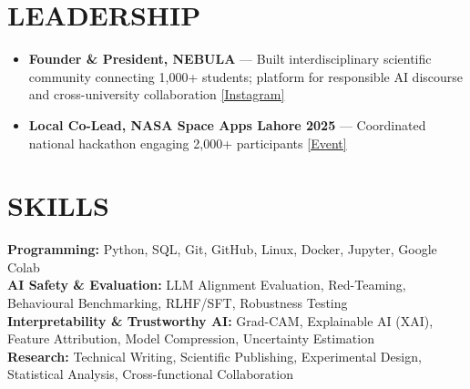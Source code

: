 \documentclass[letterpaper,9pt]{article}
\newcommand{\resumeItem}[1]{
  \item \small{#1}
}
\begin{document}
\section{LEADERSHIP}
\begin{itemize}
\resumeItem{\textbf{Founder \& President, NEBULA} — Built interdisciplinary scientific community connecting 1,000+ students; platform for responsible AI discourse and cross-university collaboration \href{https://www.instagram.com/nebula_headquarters?igsh=Ymc5ZXB4ZDAwa3Bx&utm_source=qr}{[Instagram]}}
\resumeItem{\textbf{Local Co-Lead, NASA Space Apps Lahore 2025} — Coordinated national hackathon engaging 2,000+ participants \href{https://www.spaceappschallenge.org/2025/local-events/lahore/}{[Event]}}
\end{itemize}

\section{SKILLS}
\small{
\textbf{Programming:} Python, SQL, Git, GitHub, Linux, Docker, Jupyter, Google Colab \\
\textbf{AI Safety \& Evaluation:} LLM Alignment Evaluation, Red-Teaming, Behavioural Benchmarking, RLHF/SFT, Robustness Testing \\
\textbf{Interpretability \& Trustworthy AI:} Grad-CAM, Explainable AI (XAI), Feature Attribution, Model Compression, Uncertainty Estimation \\
\textbf{Research:} Technical Writing, Scientific Publishing, Experimental Design, Statistical Analysis, Cross-functional Collaboration
}
\end{document}
